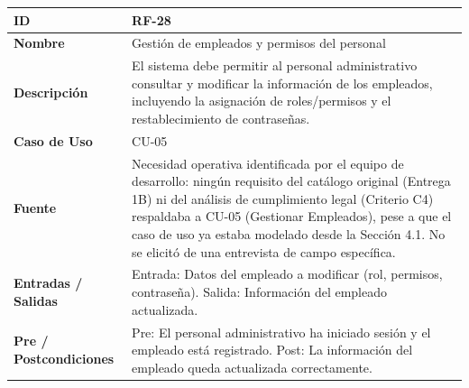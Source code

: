 \documentclass[
]{article}
\newcounter{none} %
\begin{document}
{\def\LTcaptype{none} %
\begin{longtable}[]{|
  >{\raggedright\arraybackslash}p{}|
  >{\raggedright\arraybackslash}p{}|}
\hline
\begin{minipage}[b]{\linewidth}\raggedright
\textbf{ID}
\end{minipage} & \begin{minipage}[b]{\linewidth}\raggedright
RF-28
\end{minipage} \\
\hline
\endhead
\hline
\endlastfoot
\textbf{Nombre} & \begin{minipage}[t]{\linewidth}\raggedright
Gestión de empleados y permisos del personal
\end{minipage} \\
\hline
\textbf{Descripción} & \begin{minipage}[t]{\linewidth}\raggedright
El sistema debe permitir al personal administrativo consultar y modificar la información de los empleados, incluyendo la asignación de roles/permisos y el restablecimiento de contraseñas.
\end{minipage} \\
\hline
\textbf{Caso de Uso} & \begin{minipage}[t]{\linewidth}\raggedright
CU-05
\end{minipage} \\
\hline
\textbf{Fuente} & \begin{minipage}[t]{\linewidth}\raggedright
Necesidad operativa identificada por el equipo de desarrollo: ningún requisito del catálogo original (Entrega 1B) ni del análisis de cumplimiento legal (Criterio C4) respaldaba a CU-05 (Gestionar Empleados), pese a que el caso de uso ya estaba modelado desde la Sección 4.1. No se elicitó de una entrevista de campo específica.
\end{minipage} \\
\hline
\textbf{Entradas / Salidas} & \begin{minipage}[t]{\linewidth}\raggedright
Entrada: Datos del empleado a modificar (rol, permisos, contraseña). Salida: Información del empleado actualizada.
\end{minipage} \\
\hline
\textbf{Pre / Postcondiciones} & \begin{minipage}[t]{\linewidth}\raggedright
Pre: El personal administrativo ha iniciado sesión y el empleado está registrado. Post: La información del empleado queda actualizada correctamente.

\end{minipage}
\end{longtable}}
\end{document}

